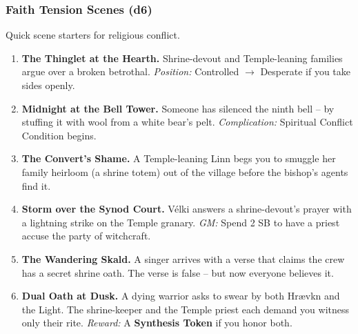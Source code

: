 \subsubsection*{Faith Tension Scenes (d6)}
Quick scene starters for religious conflict.
\begin{enumerate}[label=\arabic*., wide=0pt]
    \item \textbf{The Thinglet at the Hearth.} Shrine-devout and Temple-leaning families argue over a broken betrothal. \textit{Position:} Controlled $\rightarrow$ Desperate if you take sides openly.
    \item \textbf{Midnight at the Bell Tower.} Someone has silenced the ninth bell -- by stuffing it with wool from a white bear's pelt. \textit{Complication:} Spiritual Conflict Condition begins.
    \item \textbf{The Convert's Shame.} A Temple-leaning Linn begs you to smuggle her family heirloom (a shrine totem) out of the village before the bishop's agents find it.
    \item \textbf{Storm over the Synod Court.} V\'{e}lki answers a shrine-devout's prayer with a lightning strike on the Temple granary. \textit{GM:} Spend 2 SB to have a priest accuse the party of witchcraft.
    \item \textbf{The Wandering Skald.} A singer arrives with a verse that claims the crew has a secret shrine oath. The verse is false -- but now everyone believes it.
    \item \textbf{Dual Oath at Dusk.} A dying warrior asks to swear by both Hr{\ae}vkn and the Light. The shrine-keeper and the Temple priest each demand you witness only their rite. \textit{Reward:} A \textbf{Synthesis Token} if you honor both.
\end{enumerate}

